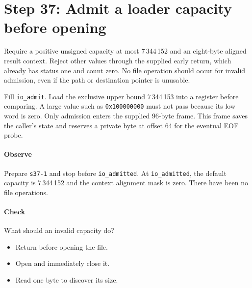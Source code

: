 \section{Step 37: Admit a loader capacity before opening}
Require a positive unsigned capacity at most 7\,344\,152 and an eight-byte
aligned result context. Reject other values through the supplied early return,
which already has status one and count zero. No file operation should occur
for invalid admission, even if the path or destination pointer is unusable.

Fill \texttt{io\_admit}. Load the exclusive upper bound 7\,344\,153 into a
register before comparing. A large value such as \texttt{0x100000000} must not
pass because its low word is zero. Only admission enters the supplied 96-byte
frame. This frame saves the caller's state and reserves a private byte at offset
64 for the eventual EOF probe.

\paragraph{Observe} Prepare \texttt{s37-1} and stop before
\texttt{io\_admitted}. At \texttt{io\_admitted}, the default capacity is 7\,344\,152
and the context alignment mask is zero. There have been no file operations.

\paragraph{Check} What should an invalid capacity do?
\begin{itemize}
  \item[A.] Return before opening the file.
  \item[B.] Open and immediately close it.
  \item[C.] Read one byte to discover its size.
\end{itemize}
